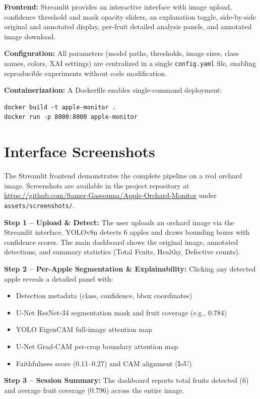 \documentclass[12pt,a4paper]{article}
\begin{document}
\textbf{Frontend:} Streamlit provides an interactive interface with image upload, confidence threshold and mask opacity sliders, an explanation toggle, side-by-side original and annotated display, per-fruit detailed analysis panels, and annotated image download.

\textbf{Configuration:} All parameters (model paths, thresholds, image sizes, class names, colors, XAI settings) are centralized in a single \texttt{config.yaml} file, enabling reproducible experiments without code modification.

\textbf{Containerization:} A Dockerfile enables single-command deployment:
\begin{lstlisting}
docker build -t apple-monitor .
docker run -p 8000:8000 apple-monitor
\end{lstlisting}

\section{Interface Screenshots}

The Streamlit frontend demonstrates the complete pipeline on a real orchard image. Screenshots are available in the project repository at \url{https://github.com/Samer-Gassouma/Apple-Orchard-Monitor} under \texttt{assets/screenshots/}.

\textbf{Step 1 -- Upload \& Detect:} The user uploads an orchard image via the Streamlit interface. YOLOv8n detects 6 apples and draws bounding boxes with confidence scores. The main dashboard shows the original image, annotated detections, and summary statistics (Total Fruits, Healthy, Defective counts).

\textbf{Step 2 -- Per-Apple Segmentation \& Explainability:} Clicking any detected apple reveals a detailed panel with:
\begin{itemize}
  \item Detection metadata (class, confidence, bbox coordinates)
  \item U-Net ResNet-34 segmentation mask and fruit coverage (e.g., 0.784)
  \item YOLO EigenCAM full-image attention map
  \item U-Net Grad-CAM per-crop boundary attention map
  \item Faithfulness score (0.11--0.27) and CAM alignment (IoU)
\end{itemize}

\textbf{Step 3 -- Session Summary:} The dashboard reports total fruits detected (6) and average fruit coverage (0.796) across the entire image.
\end{document}
